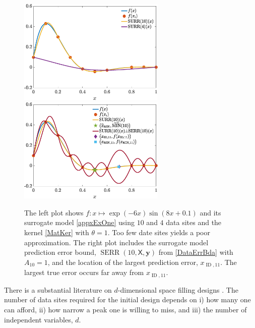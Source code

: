 \documentclass[11pt]{NSFamsart}
\DeclareMathOperator{\ID}{ID}
\DeclareMathOperator{\SURRERR}{SERR}
\newcommand{\mX}{\mathsf{X}}
\newcommand{\by}{{\boldsymbol{y}}}
\begin{document}
\begin{figure}[t]
    \centering
    \includegraphics[width = 7cm]{ProgramsImages/fandDataAndAppxSmall.eps} \qquad \qquad
    \includegraphics[width = 7cm]{ProgramsImages/fandDataAndAppxAndRMSPEAndMin.eps}
    \caption{The left plot shows $f: x \mapsto \exp(-6x) \sin(8x+0.1)$ and its surrogate model \eqref{appxExOne} using $10$ and $4$ data sites and the kernel \eqref{MatKer} with $\theta = 1$. Too few date sites yields a poor approximation.  The right plot includes the surrogate model prediction error bound, $\SURRERR(10,\mX,\by)$ from \eqref{DataErrBda} with $A_{10} =1$, and the location of the largest prediction error, $x_{\ID,11}$. The largest true error occurs far away from $x_{\ID,11}$.}
    \label{fig:sampleFun}
\end{figure}

There is a substantial literature on $d$-dimensional space filling designs \cite{FangEtal19a, Jos16a, SanWilNot03}. The number of data sites required for the initial design depends on i) how many one can afford, ii) how narrow a peak one is willing to miss, and iii) the number of independent variables, $d$.
\end{document}
